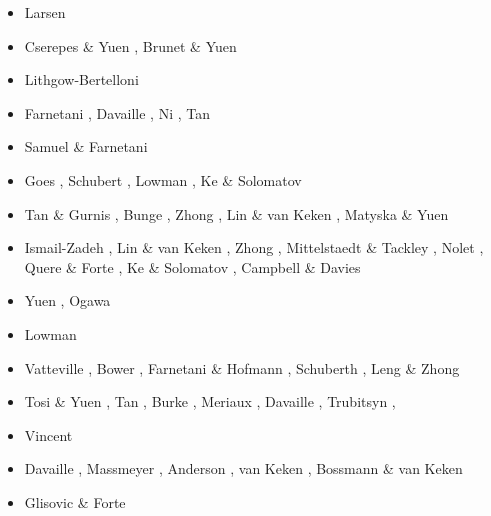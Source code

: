 \begin{scriptsize}
\begin{itemize}
\item[\nineteenninetynine] Larsen \etal \cite{lays99}
\item[\twothousand] Cserepes \& Yuen \cite{csyu00}, Brunet \& Yuen \cite{bryu00}
\item[\twothousandone] Lithgow-Bertelloni \cite{lirc01}
\item[\twothousandtwo] Farnetani \etal \cite{falt02}, Davaille \etal \cite{dagl02},
                       Ni \etal \cite{nitg02}, Tan \etal \cite{tagh02}
\item[\twothousandthree] Samuel \& Farnetani \cite{safa03}
\item[\twothousandfour] Goes \etal \cite{goch04}, Schubert \etal \cite{scmo04}, Lowman \etal \cite{lokg04},
                        Ke \& Solomatov \cite{keso04} 
\item[\twothousandfive] Tan \& Gurnis \cite{tagu05}, Bunge \cite{bung05}, Zhong \cite{zhon05}, 
                        Lin \& van Keken \cite{liva05}, Matyska \& Yuen \cite{mayu05}
\item[\twothousandsix] Ismail-Zadeh \etal \cite{isst06}, Lin \& van Keken \cite{liva06a,liva06b}, 
                       Zhong \cite{zhon06}, Mittelstaedt \& Tackley \cite{mita06},
                       Nolet \etal \cite{nokm06}, Quere \& Forte \cite{qufo06}, 
                       Ke \& Solomatov \cite{keso06}, Campbell \& Davies \cite{cada06}
\item[\twothousandseven] Yuen \etal \cite{yumh07}, Ogawa \cite{ogaw07}
\item[\twothousandeight] Lowman \etal \cite{logg08} 
\item[\twothousandnine] Vatteville \etal \cite{vavl09}, Bower \etal \cite{bogj09},
                        Farnetani \& Hofmann \cite{faho09}, Schuberth \etal \cite{scbs09b},
                        Leng \& Zhong \cite{lezh09}
\item[\twothousandeleven] Tosi \& Yuen \cite{toyu11}, Tan \etal \cite{talz11},
                          Burke \cite{burk11}, Meriaux \etal \cite{memm11}, 
                          Davaille \etal \cite{dalt11}, Trubitsyn \etal \cite{tree11},
\item[\twothousandtwelve] Vincent \etal{} \cite{viym12}
\item[\twothousandthirteen] Davaille \etal \cite{dagm13}, Massmeyer \etal \cite{madd13},
                            Anderson \cite{ande13}, van Keken \etal \cite{vadv13}, 
                            Bossmann \& van Keken \cite{bova13}
\item[\twothousandfourteen] Glisovic \& Forte \cite{glfo14} 

\end{itemize}
\end{scriptsize}
